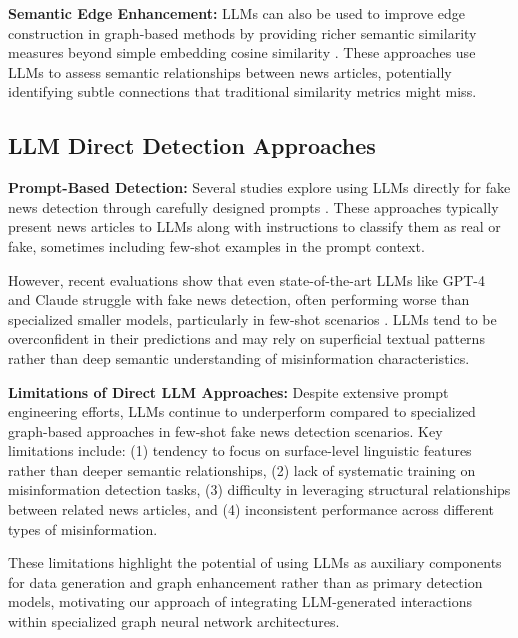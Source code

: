\textbf{Semantic Edge Enhancement:} LLMs can also be used to improve edge construction in graph-based methods by providing richer semantic similarity measures beyond simple embedding cosine similarity \cite{liu2023large, chen2023llm}. These approaches use LLMs to assess semantic relationships between news articles, potentially identifying subtle connections that traditional similarity metrics might miss.

\subsection{LLM Direct Detection Approaches}

\textbf{Prompt-Based Detection:} Several studies explore using LLMs directly for fake news detection through carefully designed prompts \cite{chen2023chatgpt, bang2023multitask}. These approaches typically present news articles to LLMs along with instructions to classify them as real or fake, sometimes including few-shot examples in the prompt context.

However, recent evaluations show that even state-of-the-art LLMs like GPT-4 and Claude struggle with fake news detection, often performing worse than specialized smaller models, particularly in few-shot scenarios \cite{huang2023chatgpt, zhang2023can}. LLMs tend to be overconfident in their predictions and may rely on superficial textual patterns rather than deep semantic understanding of misinformation characteristics.


\textbf{Limitations of Direct LLM Approaches:} Despite extensive prompt engineering efforts, LLMs continue to underperform compared to specialized graph-based approaches in few-shot fake news detection scenarios. Key limitations include: (1) tendency to focus on surface-level linguistic features rather than deeper semantic relationships, (2) lack of systematic training on misinformation detection tasks, (3) difficulty in leveraging structural relationships between related news articles, and (4) inconsistent performance across different types of misinformation.

These limitations highlight the potential of using LLMs as auxiliary components for data generation and graph enhancement rather than as primary detection models, motivating our approach of integrating LLM-generated interactions within specialized graph neural network architectures.

